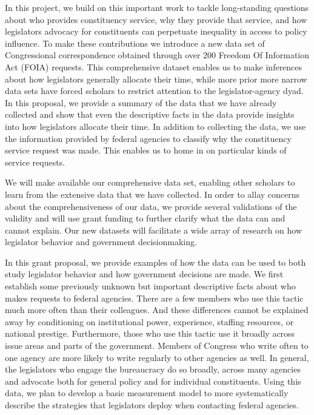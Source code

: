 \documentclass{article}
\begin{document}
In this project, we build on this important work to tackle long-standing questions about who provides constituency service, why they provide that service, and how legislators advocacy for constituents can perpetuate inequality in access to policy influence.  To make these contributions we introduce a new data set of Congressional correspondence obtained through over 200 Freedom Of Information Act (FOIA) requests.  This comprehensive dataset enables us to make inferences about how legislators generally allocate their time, while more prior more narrow data sets have forced scholars to restrict attention to the legislator-agency dyad.  In this proposal, we provide a summary of the data that we have already collected and show that even the descriptive facts in the data provide insights into how legislators allocate their time.  In addition to collecting the data, we use the information provided by federal agencies to classify why the constituency service request was made.  This enables us to home in on particular kinds of service requests. 

We will make available our comprehensive data set, enabling other scholars to learn from the extensive data that we have collected.  In order to allay concerns about the comprehensiveness of our data, we provide several validations of the validity and will use grant funding to further clarify what the data can and cannot explain. Our new datasets will facilitate a wide array of research on how legislator behavior and government decisionmaking.    

In this grant proposal, we provide examples of how the data can be used to both study legislator behavior and how government decisions are made.  We first establish some previously unknown but important descriptive facts about who makes requests to federal agencies. There are a few members who use this tactic much more often than their colleagues.  And these differences cannot be explained away by conditioning on institutional power, experience, staffing resources, or national prestige. Furthermore, those who use this tactic use it broadly across issue areas and parts of the government.  Members of Congress who write often to one agency are more likely to write regularly to other agencies as well.  In general, the legislators who engage the bureaucracy do so broadly, across many agencies and advocate both for general policy and for individual constituents.  Using this data, we plan to develop a basic measurement model to more systematically describe the strategies that legislators deploy when contacting federal agencies. 
\end{document}
